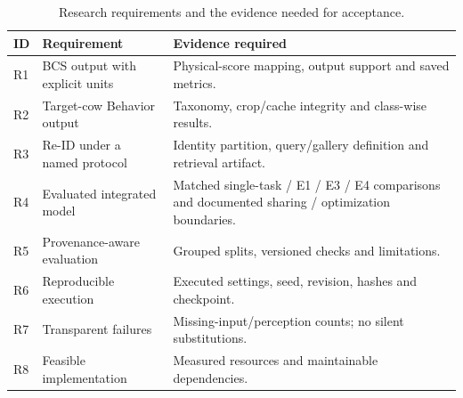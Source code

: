 \begin{table}[htbp]
\centering\small
\caption[Research requirements]{Research requirements and the evidence needed for acceptance.}\label{tab:requirements}
\begin{tabularx}{\textwidth}{lYY}
\toprule
ID & Requirement & Evidence required \\
\midrule
R1 & BCS output with explicit units & Physical-score mapping, output support and saved metrics. \\
R2 & Target-cow Behavior output & Taxonomy, crop/cache integrity and class-wise results. \\
R3 & Re-ID under a named protocol & Identity partition, query/gallery definition and retrieval artifact. \\
R4 & Evaluated integrated model & Matched single-task / E1 / E3 / E4 comparisons and documented sharing / optimization boundaries. \\
R5 & Provenance-aware evaluation & Grouped splits, versioned checks and limitations. \\
R6 & Reproducible execution & Executed settings, seed, revision, hashes and checkpoint. \\
R7 & Transparent failures & Missing-input/perception counts; no silent substitutions. \\
R8 & Feasible implementation & Measured resources and maintainable dependencies. \\
\bottomrule
\end{tabularx}
\end{table}
